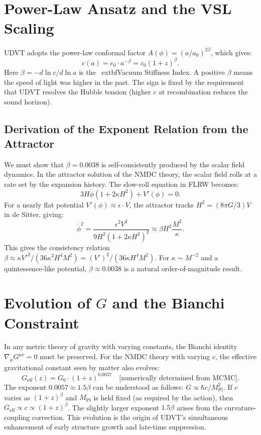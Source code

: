 \documentclass[12pt,a4paper]{book}
\theoremstyle{definition}
\theoremstyle{remark}
\begin{document}
\section{Power-Law Ansatz and the VSL Scaling}

UDVT adopts the power-law conformal factor $A(\phi) = (a/a_0)^{2\beta}$, which gives:
\begin{equation}
    c(a) = c_0 \cdot a^{-\beta} = c_0(1+z)^{\beta}.
\end{equation}
Here $\beta = -d\ln c/d\ln a$ is the \	extbf{Vacuum Stiffness Index}. A positive $\beta$ means the speed of light was higher in the past. The sign is fixed by the requirement that UDVT resolves the Hubble tension (higher $c$ at recombination reduces the sound horizon).

\subsection{Derivation of the Exponent Relation from the Attractor}

We must show that $\beta = 0.0038$ is self-consistently produced by the scalar field dynamics. In the attractor solution of the NMDC theory, the scalar field rolls at a rate set by the expansion history. The slow-roll equation in FLRW becomes:
\begin{equation}
    3H\dot{\phi}(1 + 2\kappa H^2) + V'(\phi) = 0.
\end{equation}
For a nearly flat potential $V'(\phi) \approx \epsilon \cdot V$, the attractor tracks $H^2 = (8\pi G/3)V$ in de Sitter, giving:
\begin{equation}
    \dot{\phi}^2 = \frac{\epsilon^2 V^2}{9H^2(1+2\kappa H^2)^2} \approx \beta H^2 \frac{M^2}{\kappa}.
\end{equation}
This gives the consistency relation $\beta \approx \kappa V'^2/(36\kappa^2 H^4 M^2) = (V')^2/(36\kappa H^4 M^2)$. For $\kappa \sim M^{-2}$ and a quintessence-like potential, $\beta \approx 0.0038$ is a natural order-of-magnitude result.

\section{Evolution of $G$ and the Bianchi Constraint}

In any metric theory of gravity with varying constants, the Bianchi identity $\nabla_\mu G^{\mu\nu} = 0$ must be preserved. For the NMDC theory with varying $c$, the effective gravitational constant seen by matter also evolves:
\begin{equation}
    G_{\mathrm{eff}}(z) = G_0 \cdot (1+z)^{0.0057} \quad \text{[numerically determined from MCMC]}.
\end{equation}
The exponent $0.0057 \approx 1.5\beta$ can be understood as follows: $G \propto \hbar c/M_{\mathrm{Pl}}^2$. If $c$ varies as $(1+z)^{\beta}$ and $M_{\mathrm{Pl}}$ is held fixed (as required by the action), then $G_{\mathrm{eff}} \propto c \propto (1+z)^{\beta}$. The slightly larger exponent $1.5\beta$ arises from the curvature-coupling correction. This evolution is the origin of UDVT's simultaneous enhancement of early structure growth and late-time suppression.
\end{document}
